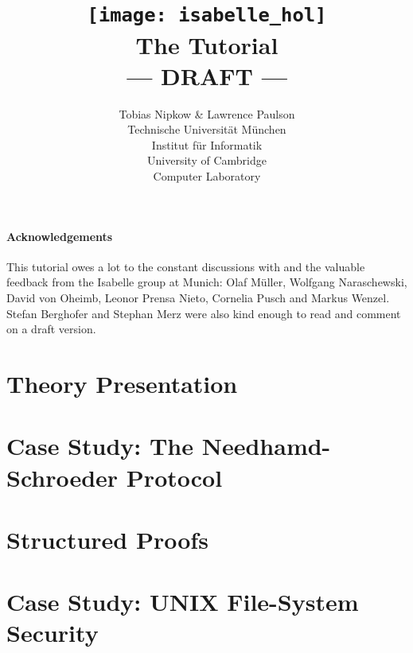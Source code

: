\documentclass{article}
\begin{document}
\title{\texttt{[image: isabelle\_hol]}
       \\ \vspace{0.5cm} The Tutorial
       \\ --- DRAFT ---}
\author{Tobias Nipkow \& Lawrence Paulson\\[1ex]
Technische Universit{\"a}t M{\"u}nchen \\
Institut f{\"u}r Informatik \\[1ex]
University of Cambridge\\
Computer Laboratory}
\maketitle

\tableofcontents

\subsubsection*{Acknowledgements}
This tutorial owes a lot to the constant discussions with and the valuable
feedback from the Isabelle group at Munich: Olaf M{\"u}ller,
Wolfgang Naraschewski, David von Oheimb, Leonor Prensa Nieto, Cornelia Pusch
and Markus Wenzel. Stefan Berghofer and Stephan Merz were also kind enough to
read and comment on a draft version.
\clearfirst







\chapter{Theory Presentation}
\chapter{Case Study: The Needhamd-Schroeder Protocol}
\chapter{Structured Proofs}
\chapter{Case Study: UNIX File-System Security}




\printindex
\end{document}
